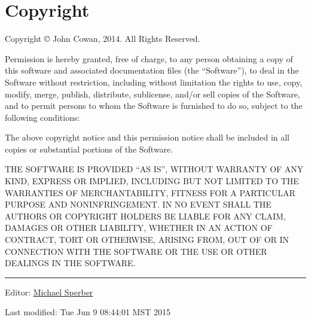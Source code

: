 \section{Copyright}\label{copyright}

Copyright © John Cowan, 2014. All Rights Reserved.

Permission is hereby granted, free of charge, to any person obtaining a
copy of this software and associated documentation files (the
``Software''), to deal in the Software without restriction, including
without limitation the rights to use, copy, modify, merge, publish,
distribute, sublicense, and/or sell copies of the Software, and to
permit persons to whom the Software is furnished to do so, subject to
the following conditions:

The above copyright notice and this permission notice shall be included
in all copies or substantial portions of the Software.

THE SOFTWARE IS PROVIDED ``AS IS'', WITHOUT WARRANTY OF ANY KIND,
EXPRESS OR IMPLIED, INCLUDING BUT NOT LIMITED TO THE WARRANTIES OF
MERCHANTABILITY, FITNESS FOR A PARTICULAR PURPOSE AND NONINFRINGEMENT.
IN NO EVENT SHALL THE AUTHORS OR COPYRIGHT HOLDERS BE LIABLE FOR ANY
CLAIM, DAMAGES OR OTHER LIABILITY, WHETHER IN AN ACTION OF CONTRACT,
TORT OR OTHERWISE, ARISING FROM, OUT OF OR IN CONNECTION WITH THE
SOFTWARE OR THE USE OR OTHER DEALINGS IN THE SOFTWARE.

\begin{center}\rule{0.5\linewidth}{\linethickness}\end{center}

Editor:
\href{mailto:srfi-editors\%20at\%20srfi\%20dot\%20schemers\%20dot\%20org}{Michael
Sperber}

Last modified: Tue Jun 9 08:44:01 MST 2015
